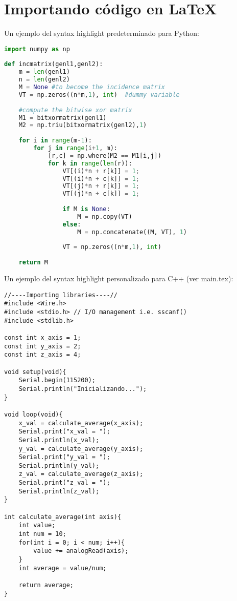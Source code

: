 
\chapter{Importando código en LaTeX} %

\label{AppendixB} %

Un ejemplo del syntax highlight predeterminado para Python:
\begin{lstlisting}[language=Python]
import numpy as np
 
def incmatrix(genl1,genl2):
    m = len(genl1)
    n = len(genl2)
    M = None #to become the incidence matrix
    VT = np.zeros((n*m,1), int)  #dummy variable
 
    #compute the bitwise xor matrix
    M1 = bitxormatrix(genl1)
    M2 = np.triu(bitxormatrix(genl2),1) 
 
    for i in range(m-1):
        for j in range(i+1, m):
            [r,c] = np.where(M2 == M1[i,j])
            for k in range(len(r)):
                VT[(i)*n + r[k]] = 1;
                VT[(i)*n + c[k]] = 1;
                VT[(j)*n + r[k]] = 1;
                VT[(j)*n + c[k]] = 1;
 
                if M is None:
                    M = np.copy(VT)
                else:
                    M = np.concatenate((M, VT), 1)
 
                VT = np.zeros((n*m,1), int)
 
    return M
\end{lstlisting}

Un ejemplo del syntax highlight personalizado para C++ (ver main.tex):

\begin{lstlisting}[style=dark_atom]
//----Importing libraries----//
#include <Wire.h>
#include <stdio.h> // I/O management i.e. sscanf()
#include <stdlib.h>

const int x_axis = 1;
const int y_axis = 2;
const int z_axis = 4;

void setup(void){
    Serial.begin(115200);
    Serial.println("Inicializando...");
}

void loop(void){
	x_val = calculate_average(x_axis);
    Serial.print("x_val = ");
    Serial.println(x_val);
    y_val = calculate_average(y_axis);
    Serial.print("y_val = ");
    Serial.println(y_val);
    z_val = calculate_average(z_axis);
    Serial.print("z_val = ");
    Serial.println(z_val);
}

int calculate_average(int axis){
    int value;
    int num = 10;
    for(int i = 0; i < num; i++){
        value += analogRead(axis);
    }
    int average = value/num;

    return average;
}
\end{lstlisting}